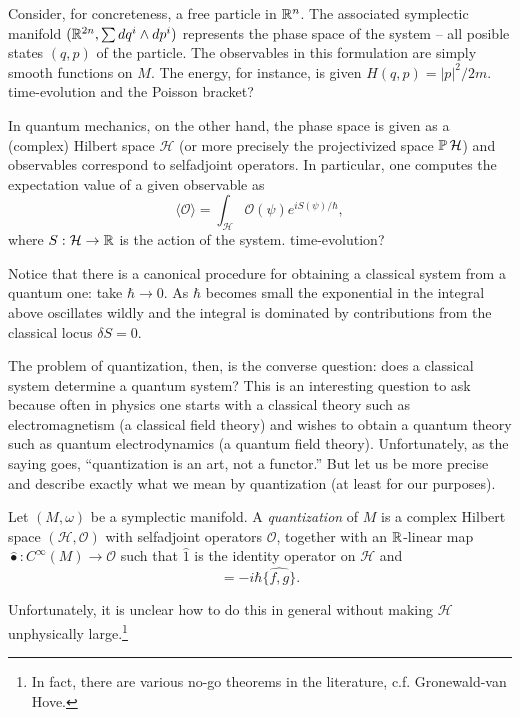 \documentclass{amsart}
\begin{document}
Consider, for concreteness, a free particle in $\mathbb{R}^n$. The associated symplectic manifold
$(\mathbb{R}^{2n}, \sum dq^i\wedge dp^i)$ represents the phase space of the system -- all posible states $(q,p)$
of the particle. The observables in this formulation are simply smooth functions on $M$. The energy, for
instance, is given $H(q,p)=|p|^2/2m$. {\color{red}time-evolution and the Poisson bracket?}

In quantum mechanics, on the other hand, the phase space is given as a (complex) Hilbert space $\mathcal{H}$
(or more precisely the projectivized space $\operatorname{\mathbb{P}} \mathcal{H}$) and observables correspond to selfadjoint
operators. In particular, one computes the expectation value of a given observable as
\begin{equation*}
    \langle\mathcal{O}\rangle = \int_\mathcal{H} \mathcal{O}(\psi) e^{iS(\psi)/\hbar},
\end{equation*}
where $S:\mathcal{H}\to\mathbb{R}$ is the action of the system. {\color{red}time-evolution?}

Notice that there is a canonical procedure for obtaining a classical system from a quantum one:
take $\hbar\to0$. As $\hbar$ becomes small the exponential in the integral above oscillates wildly
and the integral is dominated by contributions from the classical locus $\delta S=0$.

The problem of quantization, then, is the converse question: does a classical system determine
a quantum system? This is an interesting question to ask because often in physics one starts
with a classical theory such as electromagnetism (a classical field theory) and wishes to obtain
a quantum theory such as quantum electrodynamics (a quantum field theory). Unfortunately, as the saying
goes, ``quantization is an art, not a functor.'' But let us be more precise and describe exactly
what we mean by quantization (at least for our purposes).
\begin{definition}[Dirac]
    Let $(M,\omega)$ be a symplectic manifold. A \textit{quantization} of $M$ is a complex Hilbert space
    $(\mathcal{H},\mathcal{O})$ with selfadjoint operators $\mathcal{O}$, together with an $\mathbb{R}$-linear map
    $\hat\bullet:C^\infty(M)\to\mathcal{O}$ such that $\hat1$ is the identity operator on $\mathcal{H}$ and 
    \begin{equation*}
        [\hat f,\hat g] = -i\hbar\widehat{\{f,g\}}.
    \end{equation*}
\end{definition}

Unfortunately, it is unclear how to do this in general without making $\mathcal{H}$ unphysically
large.\footnote{In fact, there are various no-go theorems in the literature, c.f. Gronewald-van Hove.}
\end{document}
